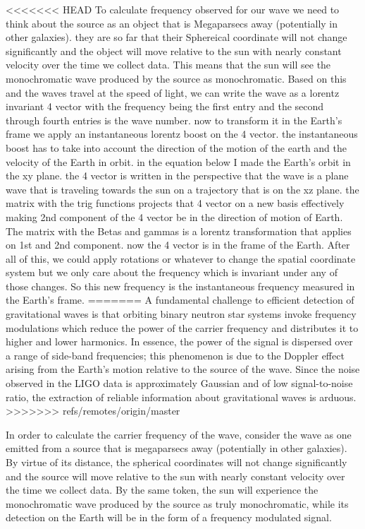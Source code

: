 \documentclass[onecolumn, groupedaddress, 10pt]{revtex4-1}
\begin{document}
<<<<<<< HEAD
To calculate frequency observed for our wave we need to think about the source as an object that is Megaparsecs away (potentially in other galaxies). they are so far that their Sphereical coordinate will not change significantly and the object will move relative to the sun with nearly constant velocity over the time we collect data. This means that the sun will see the monochromatic wave produced by the source as monochromatic. Based on this and the waves travel at the speed of light, we can write the wave as a lorentz invariant 4 vector with the frequency being the first entry and the second through fourth entries is the wave number. now to transform it in the Earth's frame we apply an instantaneous lorentz boost on the 4 vector. the instantaneous boost has to take into account the direction of the motion of the earth and the velocity of the Earth in orbit. in the equation below I made the Earth's orbit in the xy plane. the 4 vector is written in the perspective that the wave is a plane wave that is traveling towards the sun on a trajectory that is on the xz plane. the matrix with the trig functions projects that 4 vector on a new basis effectively making 2nd component of the 4 vector be in the direction of motion of Earth. The matrix with the Betas and gammas is a lorentz transformation that applies on 1st and 2nd component. now the 4 vector is in the frame of the Earth. After all of this, we could apply rotations or whatever to change the spatial coordinate system but we only care about the frequency which is invariant under any of those changes. So this new frequency is the instantaneous frequency measured in the Earth's frame.      
=======
A fundamental challenge to efficient detection of gravitational waves is that orbiting binary neutron star systems invoke frequency modulations which reduce the power of the carrier frequency and distributes it to higher and lower harmonics. In essence, the power of the signal is dispersed over a range of side-band frequencies; this phenomenon is due to the Doppler effect arising from the Earth's motion relative to the source of the wave. Since the noise observed in the LIGO data is approximately Gaussian and of low signal-to-noise ratio, the extraction of reliable information about gravitational waves is arduous.
>>>>>>> refs/remotes/origin/master

In order to calculate the carrier frequency of the wave, consider the wave as one emitted from a source that is megaparsecs away (potentially in other galaxies). By virtue of its distance, the spherical coordinates will not change significantly and the source will move relative to the sun with nearly constant velocity over the time we collect data. By the same token, the sun will experience the monochromatic wave produced by the source as truly monochromatic, while its detection on the Earth will be in the form of a frequency modulated signal.
\end{document}
